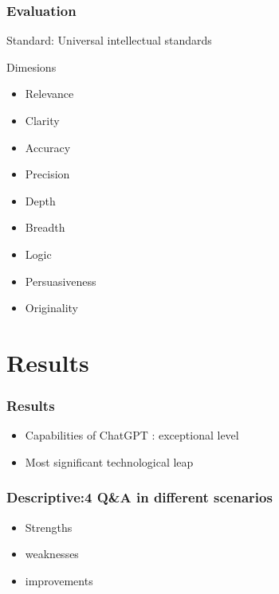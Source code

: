 \documentclass{beamer}
\begin{document}
\begin{frame}
    \frametitle{Evaluation}
    \Large{Standard: Universal intellectual standards}
    \begin{block}{Dimesions}
        \begin{multicols}{2}
            \begin{itemize}
                \item Relevance
                \item Clarity
                \item Accuracy
                \item Precision
                \item Depth
                \item Breadth
                \item Logic
                \item Persuasiveness
                \item Originality
            \end{itemize}
        \end{multicols}
    \end{block}
\end{frame}

\section{Results}
\begin{frame}
    \frametitle{Results}
    \LARGE
    \begin{itemize}[<+->]
        \item Capabilities of ChatGPT : exceptional level
        \item Most significant technological leap
    \end{itemize}
\end{frame}

\begin{frame}
    \frametitle{Descriptive:4 Q\&A in different scenarios}
    \LARGE
    \begin{itemize}
        \item Strengths
        \item weaknesses
        \item improvements
    \end{itemize}
\end{frame}
\end{document}
